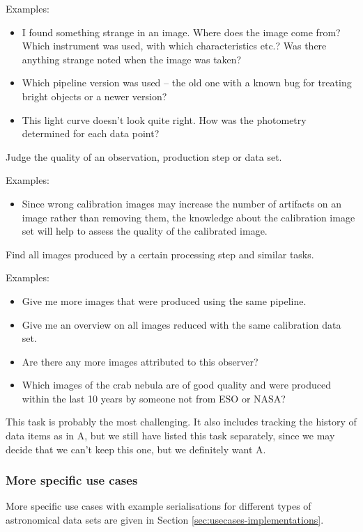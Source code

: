         \noindent Examples:
        \begin{itemize}
            \item I found something strange in an image. Where does
the image come from? Which instrument was used, with which characteristics
etc.? Was there anything strange noted when the image was taken?  
            \item Which pipeline version was used -- the old one
with a known bug for treating bright objects or a newer version?  
            \item This light curve doesn't look quite right. How was
the photometry determined for each data point?  
        \end{itemize}


        Judge the quality of an observation, production step or data set.
        
        \noindent Examples:
        \begin{itemize}
            \item Since wrong calibration images may increase the
number of artifacts on an image rather than removing them, the knowledge about
the calibration image set will help to assess the quality of the calibrated
image.  
        \end{itemize}
      

        Find all images produced by a certain processing step and similar tasks.
        
        \noindent Examples:
        \begin{itemize}
            \item Give me more images that were produced using the
same pipeline.  
            \item Give me an overview on all images reduced with the same calibration data set.  
            \item Are there any more images attributed to this observer?  
            \item Which images of the crab nebula are of good quality and were produced within the last 10 years by someone not from ESO or NASA?  
        \end{itemize}

        This task is probably the most challenging. It also includes tracking the history of data items as in A, but we still have listed this task separately, since we may decide that we can't keep this one, but we definitely want A.


\subsubsection{More specific use cases}
More specific use cases with example serialisations for different types of astronomical data sets are given in Section \ref{sec:usecases-implementations}.
